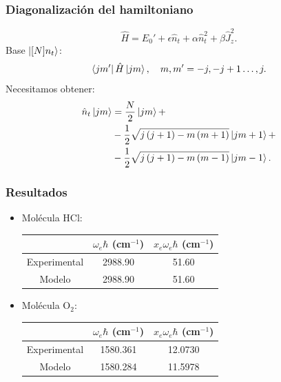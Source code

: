\documentclass{beamer}
\begin{document}
\begin{frame}
  \frametitle{Diagonalización del hamiltoniano}
  \begin{equation*}
    \hat{H} = E_0' + \epsilon\hat{n}_t + \alpha\hat{n}_t^2 + \beta\hat{J}_z^2.
  \end{equation*}
  Base $\ket{[N]n_t}$:
    \begin{equation*}
      \bra{jm'}\hat{H}\ket{jm}, \quad m,m' = -j,-j+1\dots, j.
  \end{equation*}
  Necesitamos obtener:
  \begin{equation*}
    \begin{split}
    \hat{n}_t\ket{jm} &= \frac{N}{2}\ket{jm} +\\
    &- \frac{1}{2}\sqrt{j\left(j+1\right)-m\left(m + 1\right)}\ket{jm+1}+\\
    &- \frac{1}{2}\sqrt{j\left(j+1\right)-m\left(m - 1\right)}\ket{jm-1}.
\end{split}
\end{equation*}
\end{frame}
\begin{frame}
  \frametitle{Resultados}
  \begin{itemize}
    \item Molécula HCl:
    \begin{table}[h!]
      \centering
      \begin{tabular}{|c|c|c|}
      \hline
                          & $\omega_e \hbar$ (cm$^{-1}$) & $x_e\omega_e \hbar$ (cm$^{-1}$) \\ \hline
      Experimental &     2988.90                         &   51.60                               \\ \hline
      Modelo              & 2988.90                             & 51.60                                    \\ \hline
      \end{tabular}
  \end{table}
    \item Molécula O$_2$:
    \begin{table}[t]
      \centering
      \begin{tabular}{|c|c|c|}
      \hline
                          & $\omega_e \hbar$ (cm$^{-1}$) & $x_e\omega_e \hbar$ (cm$^{-1}$)\\ \hline
      Experimental &     1580.361                         &   12.0730 \\ \hline
      Modelo              & 1580.284                             & 11.5978\\ \hline
      \end{tabular}
  \end{table}
  \end{itemize}
\end{frame}
\end{document}
